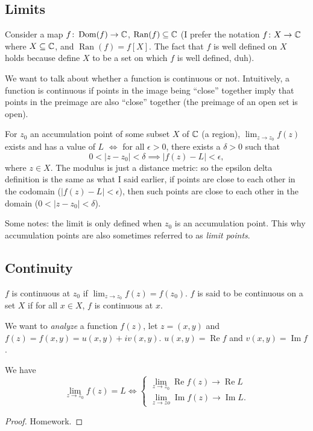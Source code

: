\subsection{Limits}
Consider a map $f \colon \operatorname{Dom}(f) \to \mathbb{C}$, $\operatorname{Ran}(f)\subseteq \mathbb{C}$ (I prefer the notation $f \colon X \to \mathbb{C}$ where $X \subseteq \mathbb{C}$, and $\operatorname{Ran}(f)=f[X]$. The fact that $f$ is well defined on $X$ holds because define $X$ to be a set on which $f$ is well defined, duh).

We want to talk about whether a function is continuous or not. Intuitively, a function is continuous if points in the image being ``close'' together imply that points in the preimage are also ``close'' together (the preimage of an open set is open).
\begin{definition}
    For $z_0$ an accumulation point of some subset $X$ of $\mathbb{C}$ (a region), $\lim_{z\to z_0}f(z)$ exists and has a value of $L$ $\iff$ for all $\epsilon>0$, there exists a $\delta >0$ such that \[
        0<|z-z_0|<\delta \implies |f(z)-L|<\epsilon,
    \] where $z\in X$. The modulus is just a distance metric: so the epsilon delta definition is the same as what I said earlier, if points are close to each other in the codomain ($|f(z)-L|<\epsilon$), then such points are close to each other in the domain ($0<|z-z_0|<\delta$).
\end{definition}
Some notes: the limit is only defined when $z_0$ is an accumulation point. This why accumulation points are also sometimes referred to as \emph{limit points}.

\subsection{Continuity}
\begin{definition}[Continuity]
    $f$ is continuous at $z_0$ if $\lim_{z\to z_0}f(z)=f(z_0)$. $f$ is said to be continuous on a set $X$ if for all $x\in X$, $f$ is continuous at $x$.
\end{definition}
We want to \emph{analyze} a function $f(z)$, let $z=(x,y)$ and $f(z)=f(x,y)=u(x,y)+iv(x,y)$. $u(x,y)=\operatorname{Re}f$ and $v(x,y)=\operatorname{Im}f$.
\begin{theorem}
    We have \[
        \lim_{z\to z_0}f(z)=L \iff
        \begin{cases}
            \lim_{z\to z_0}\operatorname{Re}f(z) \to \operatorname{Re}L\\
            \lim_{z\to zo}\operatorname{Im}f(z) \to \operatorname{Im}L.
        \end{cases}
    \]
\end{theorem}
\begin{proof}
    Homework.
\end{proof}

